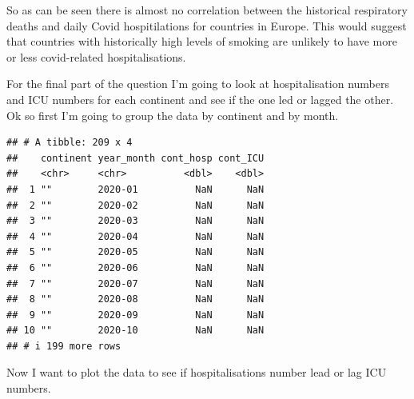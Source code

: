 \documentclass[11pt,preprint, authoryear]{elsarticle}
\numberwithin{equation}{section}
\numberwithin{figure}{section}
\numberwithin{table}{section}
\begin{document}
So as can be seen there is almost no correlation between the historical
respiratory deaths and daily Covid hospitilations for countries in
Europe. This would suggest that countries with historically high levels
of smoking are unlikely to have more or less covid-related
hospitalisations.

For the final part of the question I'm going to look at hospitalisation
numbers and ICU numbers for each continent and see if the one led or
lagged the other. Ok so first I'm going to group the data by continent
and by month.

\begin{verbatim}
## # A tibble: 209 x 4
##    continent year_month cont_hosp cont_ICU
##    <chr>     <chr>          <dbl>    <dbl>
##  1 ""        2020-01          NaN      NaN
##  2 ""        2020-02          NaN      NaN
##  3 ""        2020-03          NaN      NaN
##  4 ""        2020-04          NaN      NaN
##  5 ""        2020-05          NaN      NaN
##  6 ""        2020-06          NaN      NaN
##  7 ""        2020-07          NaN      NaN
##  8 ""        2020-08          NaN      NaN
##  9 ""        2020-09          NaN      NaN
## 10 ""        2020-10          NaN      NaN
## # i 199 more rows
\end{verbatim}

Now I want to plot the data to see if hospitalisations number lead or
lag ICU numbers.
\end{document}
